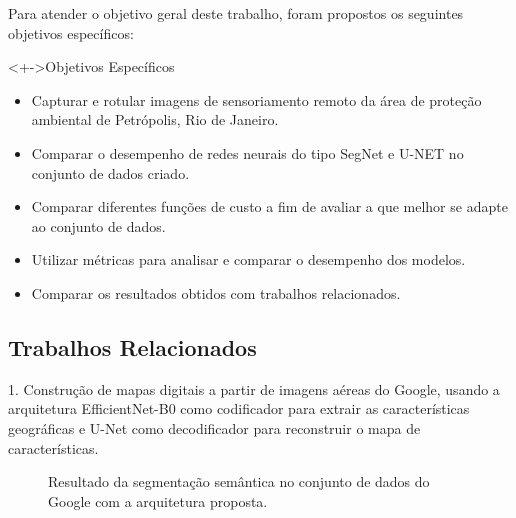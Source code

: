 \documentclass[%
  10pt,%
  aspectratio = 169,%
  compress,%
  t,%
  english,%
  brazilian,%
  tikz,
]{beamer}
\begin{document}
\begin{frame}
Para atender o objetivo geral deste trabalho, foram propostos os seguintes objetivos específicos:

\begin{block}<+->{Objetivos Específicos}
\begin{itemize}
\item Capturar e rotular imagens de sensoriamento remoto da área de proteção ambiental de
Petrópolis, Rio de Janeiro.
\item Comparar o desempenho de redes neurais do tipo SegNet e U-NET no conjunto de dados criado.
\item Comparar diferentes funções de custo a fim de avaliar a que melhor se adapte ao conjunto
de dados.
\item Utilizar métricas para analisar e comparar o desempenho dos modelos.
\item Comparar os resultados obtidos com trabalhos relacionados.
\end{itemize}
\end{block}
\end{frame}

\subsection{Trabalhos Relacionados}\label{sec:intro3}

\begin{frame}
    1.  Construção de mapas digitais a partir de imagens aéreas do Google, usando a arquitetura EfficientNet-B0 como codificador para extrair as características geográficas e U-Net como decodificador para reconstruir o mapa de características.
    \begin{figure}[!htb]
        \centering%
        \caption{Resultado da segmentação semântica no conjunto de dados do Google com a arquitetura proposta.}%
        \label{fig:khan01}
    \end{figure}
    
\end{frame}
\end{document}
